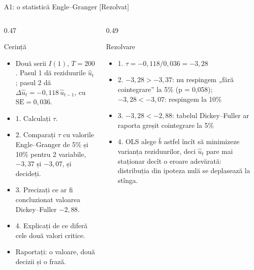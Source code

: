 \begin{frame}{A1: o statistică Engle--Granger [Rezolvat]}
\itemsize{\scriptsize}
\begin{columns}[T]
\begin{column}{0.47\textwidth}
\begin{block}{Cerință}
\begin{itemize}
    \item Două serii $I(1)$, $T = 200$. Pasul 1 dă reziduurile $\hat u_t$; pasul 2 dă $\Delta\hat u_t = -0{,}118\,\hat u_{t-1}$, cu $\mathrm{SE} = 0{,}036$.
    \item 1. Calculați $\tau$.
    \item 2. Comparați $\tau$ cu valorile Engle--Granger de 5\% și 10\% pentru 2 variabile, $-3{,}37$ și $-3{,}07$, și decideți.
    \item 3. Precizați ce ar fi concluzionat valoarea Dickey--Fuller $-2{,}88$.
    \item 4. Explicați de ce diferă cele două valori critice.
    \item Raportați: o valoare, două decizii și o frază.
\end{itemize}
\end{block}
\end{column}
\begin{column}{0.49\textwidth}
\begin{exampleblock}{Rezolvare}
\begin{itemize}
    \item 1. $\tau = -0{,}118/0{,}036 = -3{,}28$
    \item 2. $-3{,}28 > -3{,}37$: nu respingem „fără cointegrare” la 5\% (p = 0{,}058); $-3{,}28 < -3{,}07$: respingem la 10\%
    \item 3. $-3{,}28 < -2{,}88$: tabelul Dickey--Fuller ar raporta greșit cointegrare la 5\%
    \item 4. OLS alege $\hat b$ astfel încît să minimizeze varianța reziduurilor, deci $\hat u_t$ pare mai staționar decît o eroare adevărată: distribuția din ipoteza nulă se deplasează la stînga.
\end{itemize}
\end{exampleblock}
\end{column}
\end{columns}
\end{frame}

